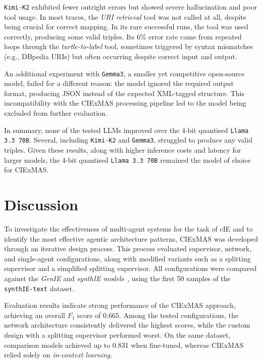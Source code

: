 \documentclass[a4paper,oneside,bibliography=totoc]{scrbook}
\begin{document}
\texttt{Kimi-K2} exhibited fewer outright errors but showed severe hallucination and poor tool usage. In most traces, the \textit{URI retrieval} tool was not called at all, despite being crucial for correct mapping. In its rare successful runs, the tool was used correctly, producing some valid triples. Its 6\% error rate came from repeated loops through the \textit{turtle-to-label} tool, sometimes triggered by syntax mismatches (e.g., DBpedia URIs) but often occurring despite correct input and output.

An additional experiment with \texttt{Gemma3}, a smaller yet competitive open-source model, failed for a different reason: the model ignored the required output format, producing JSON instead of the expected XML-tagged structure. This incompatibility with the CIExMAS processing pipeline led to the model being excluded from further evaluation.

In summary, none of the tested \acp{LLM} improved over the 4-bit quantised \texttt{Llama 3.3 70B}. Several, including \texttt{Kimi-K2} and \texttt{Gemma3}, struggled to produce any valid triples. Given these results, along with higher inference costs and latency for larger models, the 4-bit quantised \texttt{Llama 3.3 70B} remained the model of choice for CIExMAS.

\section{Discussion}
\label{sec:discussion}

To investigate the effectiveness of multi-agent systems for the task of \ac{cIE} and to identify the most effective agentic architecture patterns, CIExMAS was developed through an iterative design process. This process evaluated supervisor, network, and single-agent configurations, along with modified variants such as a splitting supervisor and a simplified splitting supervisor. All configurations were compared against the \textit{GenIE} and \textit{synthIE models}~\cite{Josifoski2021,Josifoski2023}, using the first 50 samples of the \texttt{synthIE-text} dataset.

Evaluation results indicate strong performance of the CIExMAS approach, achieving an overall $F_{1}$ score of 0.665. Among the tested configurations, the network architecture consistently delivered the highest scores, while the custom design with a splitting supervisor performed worst. On the same dataset, comparison models achieved up to 0.831 when fine-tuned, whereas CIExMAS relied solely on \textit{in-context learning}.
\end{document}
